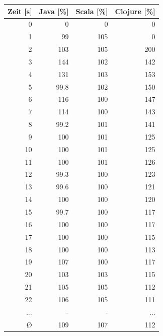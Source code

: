 \documentclass{fancydocument}
\begin{document}
\begin{center}
\begin{tabular}{|r|r|r|r|} \hline
\textbf{Zeit [s]} & \textbf{Java [\%]} & \textbf{Scala [\%]} & \textbf{Clojure [\%]}\\
\hline
0 & 0 & 0 & 0\\
\hline
1 & 99 & 105 & 0\\
\hline
2 & 103 & 105 & 200\\
\hline
3 & 144 & 102 & 142\\
\hline
4 & 131 & 103 & 153\\
\hline
5 & 99.8 & 102 & 150\\
\hline
6 & 116 & 100 & 147\\
\hline
7 & 114 & 100 & 143\\
\hline
8 & 99.2 & 101 & 141\\
\hline
9 & 100 & 101 & 125\\
\hline
10 & 100 & 101 & 125\\
\hline
11 & 100 & 101 & 126\\
\hline
12 & 99.3 & 100 & 123\\
\hline
13 & 99.6 & 100 & 121\\
\hline
14 & 100 & 100 & 120\\
\hline
15 & 99.7 & 100 & 117\\
\hline
16 & 100 & 100 & 117\\
\hline
17 & 100 & 100 & 115\\
\hline
18 & 100 & 100 & 113\\
\hline
19 & 107 & 100 & 117\\
\hline
20 & 103 & 103 & 115\\
\hline
21 & 105 & 105 & 112\\
\hline
22 & 106 & 105 & 111\\
\hline
... & - & - & ...\\
\hline
Ø & 109 & 107 & 112\\
\hline
\end{tabular}


\end{center}
\end{document}
